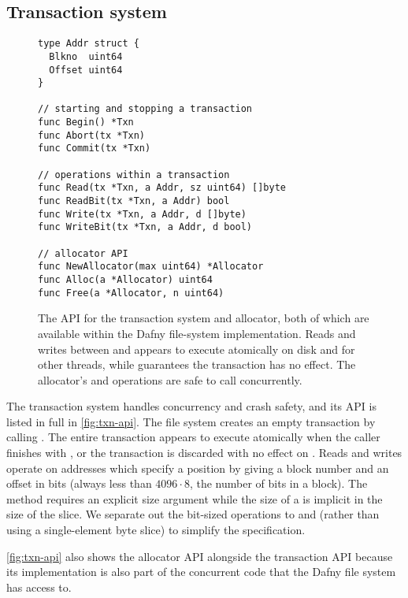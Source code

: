 \subsection{Transaction system}


\begin{figure}
\begin{verbatim}
type Addr struct {
  Blkno  uint64
  Offset uint64
}

// starting and stopping a transaction
func Begin() *Txn
func Abort(tx *Txn)
func Commit(tx *Txn)

// operations within a transaction
func Read(tx *Txn, a Addr, sz uint64) []byte
func ReadBit(tx *Txn, a Addr) bool
func Write(tx *Txn, a Addr, d []byte)
func WriteBit(tx *Txn, a Addr, d bool)

// allocator API
func NewAllocator(max uint64) *Allocator
func Alloc(a *Allocator) uint64
func Free(a *Allocator, n uint64)
\end{verbatim}
  \caption{The API for the transaction system and allocator, both of which are
    available within the Dafny file-system implementation. Reads and writes
    between  and  appears to execute atomically on disk and
    for other threads, while  guarantees the transaction has no
    effect. The allocator's  and  operations are safe to call
    concurrently.}
\label{fig:txn-api}
\end{figure}

The transaction system handles concurrency and crash safety, and its
API is listed in full in \autoref{fig:txn-api}.  The file system
creates an empty transaction by calling . The entire
transaction appears to execute atomically when the caller finishes
with , or the transaction is discarded with no effect on
. Reads and writes operate on addresses which specify a
position by giving a block number and an offset in bits (always less
than $4096 \cdot 8$, the number of bits in a block). The 
method requires an explicit size argument while the size of a
 is implicit in the size of the  slice. We separate
out the bit-sized operations to  and  (rather
than using a single-element byte slice) to simplify the specification.

\autoref{fig:txn-api} also shows the allocator API alongside the
transaction API because its implementation is also part of the
concurrent code that the Dafny file system has access to.


